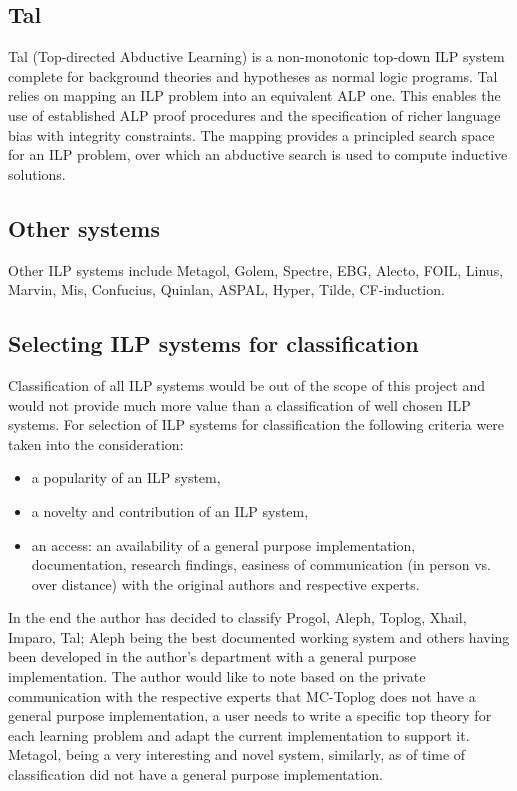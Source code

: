 \subsection{Tal\cite{corapi2010inductive}\cite{corapi2011tal}}
Tal (Top-directed Abductive Learning) is a non-monotonic top-down ILP system complete for background theories and hypotheses as normal logic programs. 
Tal relies on mapping an ILP problem into an equivalent ALP one. This enables the
use of established ALP proof procedures and the specification of richer language bias with integrity constraints. The mapping provides a principled search space for an ILP problem, over which an abductive search is used to compute inductive solutions.

\subsection{Other systems}
Other ILP systems include Metagol, Golem, Spectre, EBG, Alecto, FOIL, Linus, Marvin, Mis, Confucius, Quinlan, ASPAL, Hyper,  Tilde, CF-induction.

\subsection{Selecting ILP systems for classification}
Classification of all ILP systems would be out of the scope of this project and would not provide much more value than a classification of well chosen ILP systems.
For selection of ILP systems for classification the following criteria were taken into the consideration:

\begin{itemize}
\item a popularity of an ILP system,
\item a novelty and contribution of an ILP system,
\item an access: an availability of a general purpose implementation, documentation, research findings, easiness of communication (in person vs. over distance) with the original authors and respective experts.
\end{itemize}

In the end the author has decided to classify Progol, Aleph, Toplog, Xhail, Imparo, Tal; Aleph being the best documented working system and others having been developed in the author's department with a general purpose implementation. The author would like to note based on the private communication with the respective experts that MC-Toplog does not have a general purpose implementation, a user needs to write a specific top theory for each learning problem and adapt the current implementation to support it. Metagol\cite{muggleton2014meta}, being a very interesting and novel system, similarly, as of time of classification did not have a general purpose implementation.